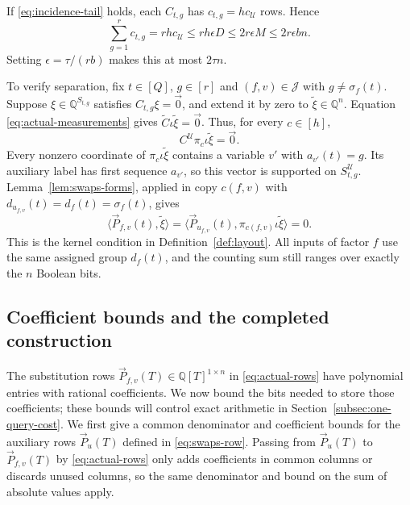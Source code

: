If \eqref{eq:incidence-tail} holds, each $C_{t,g}$ has
$c_{t,g}=hc_{\mathcal U}$ rows. Hence
\begin{equation}\label{eq:incidence-measurement-count}
 \sum_{g=1}^r c_{t,g}=rh c_{\mathcal U}
 \le rh\epsilon D\le2r\epsilon M\le2r\epsilon bn.
\end{equation}
Setting $\epsilon=\tau/(rb)$ makes this at most $2\tau n$.

To verify separation, fix $t\in[Q]$, $g\in[r]$ and
$(f,v)\in\mathcal J$ with $g\ne\sigma_f(t)$. Suppose
$\xi\in\mathbb Q^{S_{t,g}}$ satisfies $C_{t,g}\xi=\vec{0}$, and extend it
by zero to $\widetilde\xi\in\mathbb Q^n$. Equation
\eqref{eq:actual-measurements} gives
$\widetilde C\iota\widetilde\xi=\vec{0}$. Thus, for every $c\in[h]$,
\[
 C^{\mathcal U}\pi_c\iota\widetilde\xi=\vec{0}.
\]
Every nonzero coordinate of $\pi_c\iota\widetilde\xi$ contains a
variable $v'$ with $a_{v'}(t)=g$. Its auxiliary label has first
sequence $a_{v'}$, so this vector is supported on
$S^{\mathcal U}_{t,g}$. Lemma~\ref{lem:swaps-forms}, applied in copy
$c(f,v)$ with $d_{u_{f,v}}(t)=d_f(t)=\sigma_f(t)$, gives
\[
 \langle \vec{P}_{f,v}(t), \widetilde\xi\rangle
 =\langle \vec{P}_{u_{f,v}}(t), \pi_{c(f,v)}\iota\widetilde\xi\rangle=0.
\]
This is the kernel condition in Definition~\ref{def:layout}.
All inputs of factor $f$ use the same assigned group $d_f(t)$, and
the counting sum still ranges over exactly the $n$ Boolean bits.

\subsection{Coefficient bounds and the completed construction}
The substitution rows $\vec{P}_{f,v}(T)\in\mathbb Q[T]^{1\times n}$ in
\eqref{eq:actual-rows} have polynomial entries with rational
coefficients. We now bound the bits needed to store those coefficients;
these bounds will control exact arithmetic in
Section~\ref{subsec:one-query-cost}.
We first give a common denominator and coefficient bounds for the
auxiliary rows $\vec{P}_u(T)$ defined in \eqref{eq:swaps-row}.
Passing from $\vec{P}_u(T)$ to $\vec{P}_{f,v}(T)$ by \eqref{eq:actual-rows} only
adds coefficients in common columns or discards unused columns,
so the same denominator and bound on the sum of absolute values apply.

